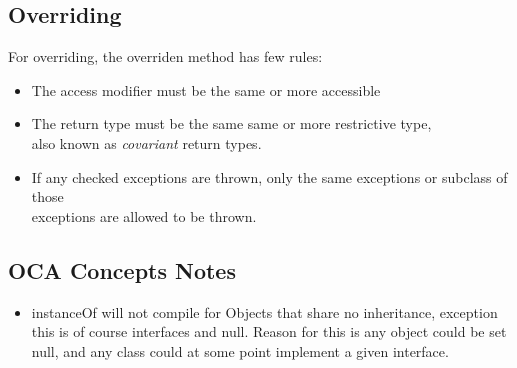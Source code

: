\documentclass[12pt]{article}
\begin{document}
\subsection{Overriding}
For overriding, the overriden method has few rules:

\begin{itemize}
  \item The access modifier must be the same or more accessible
  \item The return type must be the same same or more restrictive type, \\
   also known as \textit{covariant} return types.
  \item If any checked exceptions are thrown, only the same exceptions or subclass of those \\
   exceptions are allowed to be thrown.
 \end{itemize}


\subsection{OCA Concepts Notes} 
\begin{itemize}
  \item instanceOf will not compile for Objects that share no inheritance, exception this is of course interfaces and null.
    \subitem Reason for this is any object could be set null, and any class could at some point implement a given interface.
\end{itemize}
\end{document}
